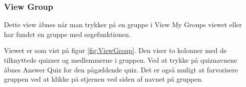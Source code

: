 \subsubsection{View Group}
Dette view åbnes når man trykker på en gruppe i View My Groups viewet eller har fundet en gruppe med søgefunktionen.

Viewet er som vist på figur \ref{fig:ViewGroup}. Den viser to kolonner med de tilknyttede quizzer og medlemmerne i gruppen. Ved at trykke på quiznavnene åbnes Answer Quiz for den pågældende quiz. Det er også muligt at farvorisere gruppen ved at klikke på stjernen ved siden af navnet på gruppen. 

